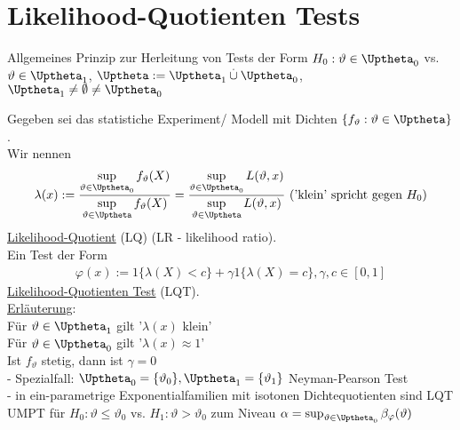 \documentclass[a4paper,openany]{book}
\theoremstyle{mytheoremstyle}
\theoremstyle{mytheoremstyle2}
\begin{document}
\chapter{Likelihood-Quotienten Tests}
Allgemeines Prinzip zur Herleitung von Tests der Form $H_0:\vartheta \in \Uptheta_0$ vs. $\vartheta  \in \Uptheta _1$, $\Uptheta:=\Uptheta_1 \overset{.}\cup \Uptheta_0$, $\Uptheta_1 \neq \emptyset \neq \Uptheta_0$   
\begin{defi}{12.1}{}
Gegeben sei das statistiche Experiment/ Modell mit Dichten $\{f _{\vartheta }:\vartheta \in \Uptheta\}$.  \\
Wir nennen 
\begin{align*}
  \lambda (x):=\frac{\sup\limits _{\vartheta \in \Uptheta_0}f _{\vartheta }(X)}{\sup\limits _{\vartheta \in \Uptheta}f _{\vartheta }(X)}=\frac{\sup\limits _{\vartheta \in \Uptheta_0}L(\vartheta ,x)}{\sup\limits _{\vartheta \in \Uptheta}L(\vartheta ,x)} \text{ ('klein' spricht gegen $H_0$)}
\end{align*}
\underline{Likelihood-Quotient} (LQ) (LR - likelihood ratio). \\
Ein Test der Form 
\begin{align*}
  \varphi (x):=1 \{\lambda (X)<c\}+\gamma 1 \{\lambda (X)=c\}, \gamma,c \in [0,1]
\end{align*}
\underline{Likelihood-Quotienten Test} (LQT). \\
\underline{Erläuterung}:\\
Für $\vartheta \in \Uptheta_1$ gilt '$\lambda (x)$ klein' \\
Für $\vartheta \in \Uptheta_0$ gilt '$\lambda (x)\approx 1$' \\
Ist $f _{\vartheta }$ stetig, dann ist $\gamma =0$ \\
- Spezialfall: $\Uptheta_0=\{\vartheta _0\},\Uptheta_1=\{\vartheta _1\}$ Neyman-Pearson Test \\
- in ein-parametrige Exponentialfamilien mit isotonen Dichtequotienten sind LQT UMPT für $H_0:\vartheta \leq \vartheta _0$ vs. $H_1:\vartheta >\vartheta _0$ zum Niveau $\alpha =\sup _{\vartheta \in \Uptheta_0}\beta _{\varphi }(\vartheta )$   
\end{defi}
\end{document}
